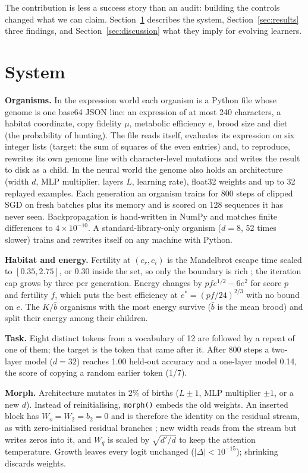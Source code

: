 \documentclass[10pt,twocolumn]{article}
\begin{document}
The contribution is less a success story than an audit: building the controls
changed what we can claim. Section~\ref{sec:system} describes the system,
Section~\ref{sec:results} three findings, and Section~\ref{sec:discussion}
what they imply for evolving learners.

\section{System}\label{sec:system}
\textbf{Organisms.} In the expression world each organism is a Python file
whose genome is one base64 JSON line: an expression of at most 240 characters,
a habitat coordinate, copy fidelity $\mu$, metabolic efficiency $e$, brood
size and diet (the probability of hunting). The file reads itself, evaluates
its expression on six integer lists (target: the sum of squares of the even
entries) and, to reproduce, rewrites its own genome line with character-level
mutations and writes the result to disk as a child. In the neural world the
genome also holds an architecture (width $d$, MLP multiplier, layers $L$,
learning rate), float32 weights and up to 32 replayed examples. Each
generation an organism trains for 800 steps of clipped SGD on fresh batches
plus its memory and is scored on 128 sequences it has never seen.
Backpropagation is hand-written in NumPy and matches finite differences to
$4\times10^{-10}$. A standard-library-only organism ($d=8$, 52 times slower)
trains and rewrites itself on any machine with Python.

\textbf{Habitat and energy.} Fertility at $(c_r,c_i)$ is the Mandelbrot escape
time scaled to $[0.35,2.75]$, or 0.30 inside the set, so only the boundary is
rich \cite{mandelbrot}; the iteration cap grows by three per generation.
Energy changes by $p f e^{1/2}-6e^2$ for score $p$ and fertility $f$, which
puts the best efficiency at $e^*=(pf/24)^{2/3}$ with no bound on $e$. The
$K/\bar b$ organisms with the most energy survive ($\bar b$ is the mean brood)
and split their energy among their children.

\textbf{Task.} Eight distinct tokens from a vocabulary of 12 are followed by a
repeat of one of them; the target is the token that came after it. After 800
steps a two-layer model ($d=32$) reaches 1.00 held-out accuracy and a
one-layer model 0.14, the score of copying a random earlier token (1/7).

\textbf{Morph.} Architecture mutates in 2\% of births ($L\pm1$, MLP multiplier
$\pm1$, or a new $d$). Instead of reinitialising, \texttt{morph()} embeds the
old weights. An inserted block has $W_o=W_2=b_2=0$ and is therefore the
identity on the residual stream, as with zero-initialised residual branches
\cite{net2net,rezero}; new width reads from the stream but writes zeros into
it, and $W_q$ is scaled by $\sqrt{d'/d}$ to keep the attention temperature.
Growth leaves every logit unchanged ($|\Delta|<10^{-15}$); shrinking discards
weights.
\end{document}
